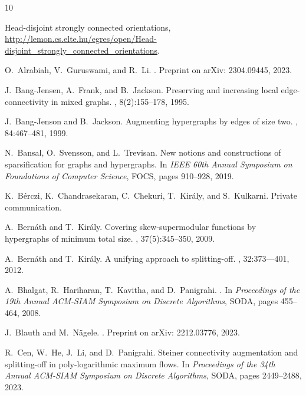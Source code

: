 \documentclass{article}
\begin{document}

\begin{thebibliography}{10}

{Head-disjoint strongly connected orientations, {\url{http://lemon.cs.elte.hu/egres/open/Head-disjoint_strongly_connected_orientations}}}.

O.~Alrabiah, V.~Guruswami, and R.~Li.
.
\newblock Preprint on arXiv: 2304.09445, 2023.

J.~Bang-Jensen, A.~Frank, and B.~Jackson.
\newblock Preserving and increasing local edge-connectivity in mixed graphs.
, 8(2):155--178, 1995.

J.~Bang-Jenson and B.~Jackson.
\newblock Augmenting hypergraphs by edges of size two.
, 84:467--481, 1999.

N.~Bansal, O.~Svensson, and L.~Trevisan.
\newblock New notions and constructions of sparsification for graphs and hypergraphs.
\newblock In {\em IEEE 60th Annual Symposium on Foundations of Computer Science}, FOCS, pages 910--928, 2019.

K.~B{\'e}rczi, K.~Chandrasekaran, C.~Chekuri, T.~Kir{\'a}ly, and S.~Kulkarni.
\newblock Private communication.

A.~Bern\'{a}th and T.~Kir\'{a}ly.
\newblock Covering skew-supermodular functions by hypergraphs of minimum total size.
, 37(5):345--350, 2009.

A.~Bern\'{a}th and T.~Kir\'{a}ly.
\newblock A unifying approach to splitting-off.
, 32:373--–401, 2012.

A.~Bhalgat, R.~Hariharan, T.~Kavitha, and D.~Panigrahi.
.
\newblock In {\em Proceedings of the 19th Annual ACM-SIAM Symposium on Discrete Algorithms}, SODA, pages 455--464, 2008.

J.~Blauth and M.~N\"{a}gele.
.
\newblock Preprint on arXiv: 2212.03776, 2023.

R.~Cen, W.~He, J.~Li, and D.~Panigrahi.
\newblock Steiner connectivity augmentation and splitting-off in poly-logarithmic maximum flows.
\newblock In {\em Proceedings of the 34th Annual ACM-SIAM Symposium on Discrete Algorithms}, SODA, pages 2449--2488, 2023.


\end{thebibliography}
\end{document}
